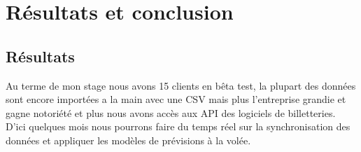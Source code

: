 \chapter{Résultats et conclusion}

\section{Résultats}

Au terme de mon stage nous avons 15 clients en bêta test, la plupart des données sont encore importées a la main avec une CSV mais plus l'entreprise grandie et gagne notoriété et plus nous avons accès aux API des logiciels de billetteries.
\\

D'ici quelques mois nous pourrons faire du temps réel sur la synchronisation des données et appliquer les modèles de prévisions à la volée.

